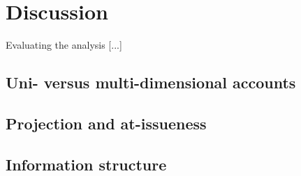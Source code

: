 \section{Discussion}

Evaluating the analysis [...]

\subsection{Uni- versus multi-dimensional accounts}

\citet{schlenker2013supplements}

\subsection{Projection and at-issueness}

\citet{simons2010projects}

\subsection{Information structure}


